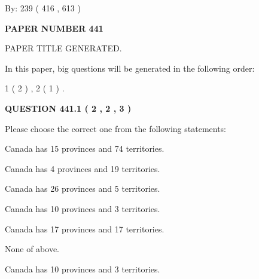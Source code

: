 \documentclass[12pt]{article}
\begin{document}
   
\hspace{1.0in} By: 
 239 ( 416 ,  613 )
   
   
   
   
\newpage 
\setcounter{page}{ 
   441001 } 
   
   
   
   
 {\textbf{ \Large{ PAPER NUMBER  441  }}}
   
   
\vspace{0.2in}
   
   
   
   
   
   
   
   
 \vspace{0.2in}
 
 
 
 
   
   
 PAPER TITLE GENERATED.
   
   
   
\vspace{0.2in}
   
In this paper, big questions will be generated in the following order: 
   
   
   1 ( 2 )
 ,
   2 ( 1 )
 .
  
\vspace{0.2in}
  
{\textbf{\Large{QUESTION
441.1 
 ( 2 , 2 , 3 )
}}}
  
  
Please choose the correct one from the following statements:
 
 
Canada has  15 provinces and  74 territories.
 
 
Canada has   4 provinces and  19 territories.
 
 
Canada has  26 provinces and  5 territories.
 
 
Canada has 10  provinces and 3 territories.
 
 
Canada has  17 provinces and  17 territories.
 
 
 None of above.
 
 
\noindent{}
 
 
Canada has 10  provinces and 3 territories.
 
\end{document}
